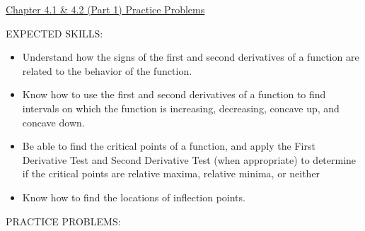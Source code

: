 \documentclass[12pt]{article}
\begin{document}
\begin{center}
\underline{\LARGE{Chapter 4.1 \& 4.2 (Part 1) Practice Problems}}
\end{center}

\noindent EXPECTED SKILLS:

\begin{itemize}

\item Understand how the signs of the first and second derivatives of a function are related to the behavior of the function. 

\item Know how to use the first and second derivatives of a function to find intervals on which the function is increasing, decreasing, concave
up, and concave down. 

\item Be able to find the critical points of a function, and apply the First Derivative Test and Second Derivative Test (when appropriate) to determine if the critical points are relative maxima, relative minima, or neither

\item Know how to find the locations of inflection points.

\end{itemize}

\noindent PRACTICE PROBLEMS:

\medskip
\end{document}

